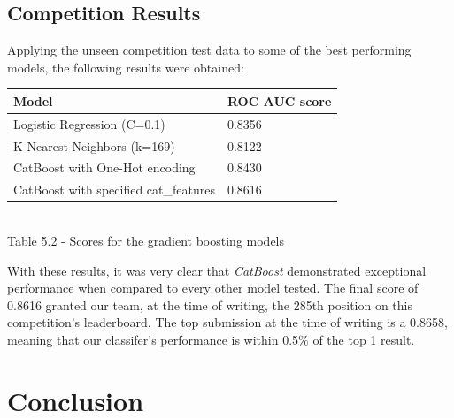 \documentclass{IEEEtran}
\begin{document}
\subsection{Competition Results}

Applying the unseen competition test data to some of the best performing models, the following results were obtained:

\begin{center}
    \begin{tabular}{|l|l|}
        \hline
    \textbf{Model} & \textbf{ROC AUC score} \\ 
    \hline \hline
    Logistic Regression (C=0.1) & 0.8356 \\ \hline
    K-Nearest Neighbors (k=169) & 0.8122 \\ \hline
    CatBoost with One-Hot encoding & 0.8430 \\ \hline
    CatBoost with specified cat\_features & 0.8616 \\ \hline
    \end{tabular}\\
    
    \vspace{6pt}
    Table 5.2 - Scores for the gradient boosting models
\end{center}

With these results, it was very clear that \textit{CatBoost} demonstrated exceptional performance when compared to every other model tested. The final score of 0.8616 granted our team, at the time of writing, the 285th position on this competition's leaderboard. The top submission at the time of writing is a 0.8658, meaning that our classifer's performance is within 0.5\% of the top 1 result.  

\section{Conclusion}

\vfill
\pagebreak
\end{document}
